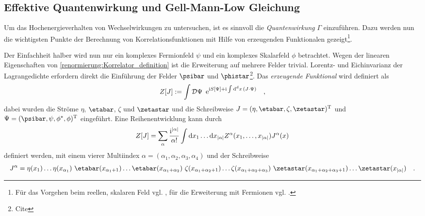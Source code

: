     
  \subsection{Effektive Quantenwirkung und Gell-Mann-Low Gleichung}
    Um das Hochenergieverhalten von Wechselwirkungen zu untersuchen, ist 
    es sinnvoll die \textit{Quantenwirkung} $\Gamma$ einzuführen. Dazu werden 
    nun die wichtigsten Punkte der Berechnung von Korrelationsfunktionen mit 
    Hilfe von erzeugenden Funktionalen gezeigt\footnote{Für das Vorgehen beim 
    reellen, skalaren Feld vgl. \cite{Zinn}, für die Erweiterung mit Fermionen 
    vgl. \cite{Schwartz}.}.
    
    Der Einfachheit halber wird nun nur ein komplexes Fermionfeld $\psi$ und ein 
    komplexes Skalarfeld $\phi$ betrachtet. Wegen der linearen Eigenschaften von 
    \eqref{renormierung:Korrelator_definition} ist die Erweiterung auf mehrere 
    Felder trivial. Lorentz- und Eichinvarianz der Lagrangedichte erfordern 
    direkt die Einführung der Felder $\psibar$ und $\phistar$\footnote{Cite}. 
    Das \textit{erzeugende Funktional} wird definiert als 
    \begin{equation}
    Z[J] := \int \mathcal{D}\Psi \,\,\, 
    \text{e}^{\text{i} S[\Psi]+ 
    \text{i} 
    \int \text{d}^d x \, \left(J \cdot \Psi \right)}
    \quad ,
    \label{renormierung:erzeugendes_Funktional_definition} 
    \end{equation}
    dabei wurden die Ströme $\eta$, $\etabar$, $\zeta$ und $\zetastar$ und die 
    Schreibweise $J=(\eta,\etabar,\zeta,\zetastar)^\text{T}$ und 
    $\Psi=(\psibar,\psi,\phi^*,\phi)^\text{T}$
    eingeführt. Eine Reihenentwicklung kann durch
    \begin{equation}
     Z[J] = \sum\limits_\alpha \frac{ \text{i}^{|\alpha|}}{\alpha!}  
     \int \text{d} x_1 \ldots \text{d} x_{|\alpha|} Z^{\alpha}(x_1,\ldots,x_{|\alpha|} )
     J^\alpha (x) \label{renormierung:Reihenentwicklung}
    \end{equation}
    definiert werden, mit einem vierer 
    Multiindex $\alpha=(\alpha_1,\alpha_2
    ,\alpha_3,\alpha_4)$ und der Schreibweise 
    \begin{equation}
      J^\alpha=
      \eta	(x_1)		\ldots \eta(x_{\alpha_1}) 	\,\,
      \etabar(x_{\alpha_1 +1})	\ldots \etabar(x_{\alpha_1+\alpha_2})	\,\,
      \zeta(x_{\alpha_1+\alpha_2 +1})	\ldots 
      \zeta(x_{\alpha_1+\alpha_2+\alpha_3})	\,\,
      \zetastar(x_{\alpha_1+\alpha_2+\alpha_3 +1})	\ldots 
      \zetastar(x_{|\alpha|})   \quad .
      \label{renormierung:Strom}
    \end{equation}
